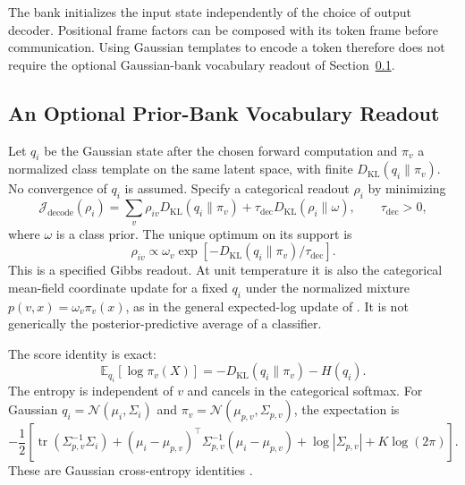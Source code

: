 \documentclass[twoside,11pt]{article}
\begin{document}
The bank initializes the input state independently of the choice of output decoder. Positional frame factors can be composed with its token frame before communication. Using Gaussian templates to encode a token therefore does not require the optional Gaussian-bank vocabulary readout of Section~\ref{sec:supp_decode_derivation}.

\subsection{An Optional Prior-Bank Vocabulary Readout}
\label{sec:supp_decode_derivation}

Let $q_i$ be the Gaussian state after the chosen forward computation and $\pi_v$ a normalized class template on the same latent space, with finite $D_{\mathrm{KL}}(q_i\|\pi_v)$. No convergence of $q_i$ is assumed. Specify a categorical readout $\rho_i$ by minimizing
\begin{equation}
\mathcal J_{\mathrm{decode}}(\rho_i)
=\sum_v\rho_{iv}D_{\mathrm{KL}}(q_i\|\pi_v)
+\tau_{\mathrm{dec}}D_{\mathrm{KL}}(\rho_i\|\omega),
\qquad\tau_{\mathrm{dec}}>0,
\end{equation}
where $\omega$ is a class prior. The unique optimum on its support is
\begin{equation}
\rho_{iv}\propto\omega_v\exp\left[-D_{\mathrm{KL}}(q_i\|\pi_v)/\tau_{\mathrm{dec}}\right].
\label{eq:supp_decode_canonical}
\end{equation}
This is a specified Gibbs readout. At unit temperature it is also the categorical mean-field coordinate update for a fixed $q_i$ under the normalized mixture $p(v,x)=\omega_v\pi_v(x)$, as in the general expected-log update of \citet[\S2.4, Eqs.~17--18]{Blei2017}. It is not generically the posterior-predictive average of a classifier.

The score identity is exact:
\begin{equation}
\mathbb E_{q_i}[\log\pi_v(X)]
=-D_{\mathrm{KL}}(q_i\|\pi_v)-H(q_i).
\label{eq:supp_kl_decomposition}
\end{equation}
The entropy is independent of $v$ and cancels in the categorical softmax. For Gaussian $q_i=\mathcal N(\mu_i,\Sigma_i)$ and $\pi_v=\mathcal N(\mu_{p,v},\Sigma_{p,v})$, the expectation is
\begin{equation}
-\frac12\left[
\operatorname{tr}(\Sigma_{p,v}^{-1}\Sigma_i)
+(\mu_i-\mu_{p,v})^\top\Sigma_{p,v}^{-1}(\mu_i-\mu_{p,v})
+\log|\Sigma_{p,v}|+K\log(2\pi)
\right].
\label{eq:supp_expected_loglik}
\end{equation}
These are Gaussian cross-entropy identities \citep{Bishop2006}.
\end{document}
